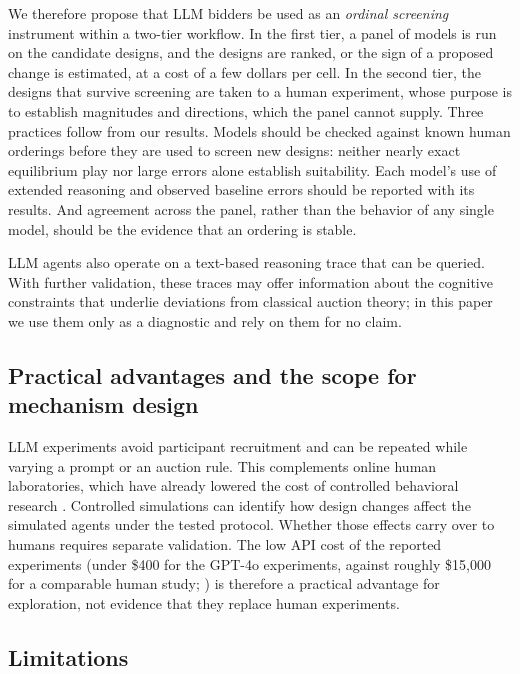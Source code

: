 \documentclass{article} %
\newif\ifmarkrev
\newcommand{\rev}[1]{\ifmarkrev\begingroup\color{red}#1\endgroup\else#1\fi}
\begin{document}
\rev{We therefore propose that LLM bidders be used as an \emph{ordinal screening} instrument within a two-tier workflow. In the first tier, a panel of models is run on the candidate designs, and the designs are ranked, or the sign of a proposed change is estimated, at a cost of a few dollars per cell. In the second tier, the designs that survive screening are taken to a human experiment, whose purpose is to establish magnitudes and directions, which the panel cannot supply. Three practices follow from our results. Models should be checked against known human orderings before they are used to screen new designs: neither nearly exact equilibrium play nor large errors alone establish suitability. Each model's use of extended reasoning and observed baseline errors should be reported with its results. And agreement across the panel, rather than the behavior of any single model, should be the evidence that an ordering is stable.}

\rev{LLM agents also operate on a text-based reasoning trace that can be queried. With further validation, these traces may offer information about the cognitive constraints that underlie deviations from classical auction theory; in this paper we use them only as a diagnostic and rely on them for no claim.}

\subsection{\texorpdfstring{\rev{Practical advantages and the scope for mechanism design}}{Practical advantages and the scope for mechanism design}}

\rev{LLM experiments avoid participant recruitment and can be repeated while varying a prompt or an auction rule. This complements online human laboratories, which have already lowered the cost of controlled behavioral research \citep{horton2011online, oprea2024decisions, enke2024behavioral}. Controlled simulations can identify how design changes affect the simulated agents under the tested protocol. Whether those effects carry over to humans requires separate validation. The low API cost of the reported experiments (under \$400 for the GPT-4o experiments, against roughly \$15,000 for a comparable human study; \citealp{li2017obviously}) is therefore a practical advantage for exploration, not evidence that they replace human experiments.}

\subsection{\texorpdfstring{\rev{Limitations}}{Limitations}}
\end{document}
